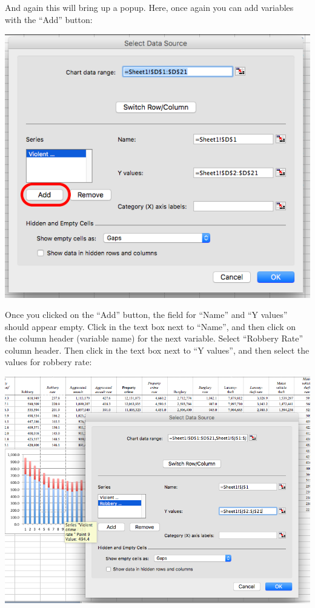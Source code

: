 \documentclass[
]{book}
\begin{document}
And again this will bring up a popup. Here, once again you can add variables with the ``Add'' button:

\includegraphics{imgs/stackedbar_4.png}

Once you clicked on the ``Add'' button, the field for ``Name'' and ``Y values'' should appear empty. Click in the text box next to ``Name'', and then click on the column header (variable name) for the next variable. Select ``Robbery Rate'' column header. Then click in the text box next to ``Y values'', and then select the values for robbery rate:

\includegraphics{imgs/stackedbar_5.png}
\end{document}
